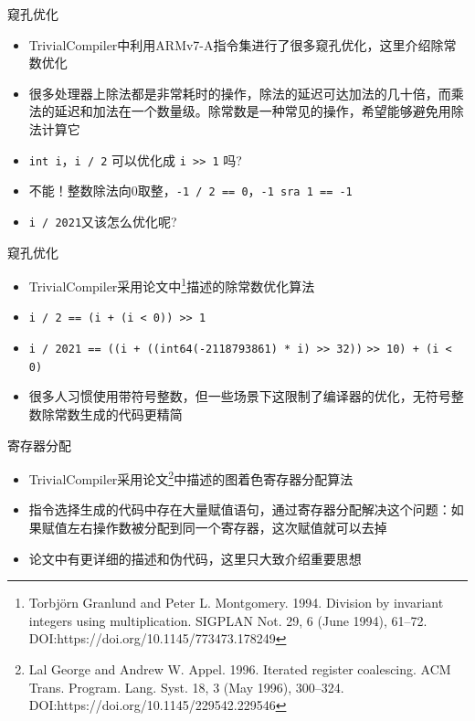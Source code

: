 \documentclass{beamer}
\begin{document}
\begin{frame}{窥孔优化}
\begin{itemize}
  \item TrivialCompiler中利用ARMv7-A指令集进行了很多窥孔优化，这里介绍除常数优化
  \item 很多处理器上除法都是非常耗时的操作，除法的延迟可达加法的几十倍，而乘法的延迟和加法在一个数量级。除常数是一种常见的操作，希望能够避免用除法计算它
  \item \lstinline|int i|，\lstinline|i / 2| 可以优化成 \lstinline|i >> 1| 吗?
  \pause
  \item 不能！整数除法向0取整，\lstinline|-1 / 2 == 0|，\lstinline|-1 sra 1 == -1|
  \item \lstinline|i / 2021|又该怎么优化呢?
\end{itemize}
\end{frame}

\begin{frame}{窥孔优化}
\begin{itemize}
  \item TrivialCompiler采用论文中\footnote[1]{Torbjörn Granlund and Peter L. Montgomery. 1994. Division by invariant integers using multiplication. SIGPLAN Not. 29, 6 (June 1994), 61–72. DOI:https://doi.org/10.1145/773473.178249}描述的除常数优化算法
  \item \lstinline|i / 2 == (i + (i < 0)) >> 1|
  \item \lstinline|i / 2021 == ((i + ((int64(-2118793861) * i) >> 32))| \lstinline|>> 10) + (i < 0)|
  \pause
  \item 很多人习惯使用带符号整数，但一些场景下这限制了编译器的优化，无符号整数除常数生成的代码更精简
\end{itemize}
\end{frame}

\begin{frame}{寄存器分配}
\begin{itemize}
  \item TrivialCompiler采用论文\footnote[1]{Lal George and Andrew W. Appel. 1996. Iterated register coalescing. ACM Trans. Program. Lang. Syst. 18, 3 (May 1996), 300–324. DOI:https://doi.org/10.1145/229542.229546}中描述的图着色寄存器分配算法
  \item 指令选择生成的代码中存在大量赋值语句，通过寄存器分配解决这个问题：如果赋值左右操作数被分配到同一个寄存器，这次赋值就可以去掉
  \item 论文中有更详细的描述和伪代码，这里只大致介绍重要思想
\end{itemize}
\end{frame}
\end{document}
